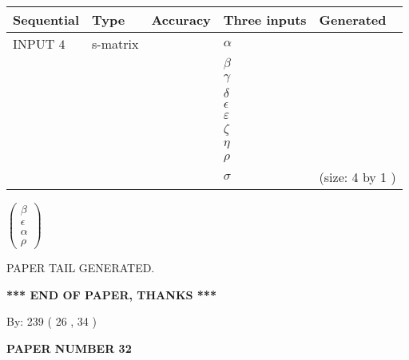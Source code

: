 \documentclass[12pt]{article}
\begin{document}
  
\noindent\begin{tabular}{|l|l|l|l|l|}
\hline
 Sequential & Type & Accuracy & Three inputs & Generated \\ 
\hline
 
 
  INPUT $  4 $ & s-matrix & & 
 $  \alpha $ & 
  \\
  & & & 
 $  \beta $ & 
  \\
  & & & 
 $  \gamma $ & 
  \\
  & & & 
 $  \delta $ & 
  \\
  & & & 
 $  \epsilon $ & 
  \\
  & & & 
 $  \varepsilon $ & 
  \\
  & & & 
 $                     \zeta $ & 
  \\
  & & & 
 $  \eta $ & 
  \\
  & & & 
 $  \rho $ & 
  \\
  & & & 
 $  \sigma $ & 
  (size:  4  by  1 )
 \\  \hline  
 \end{tabular}
   
   
 $  \left( \begin{array}
 {
 c
 }
 \beta \\ 
 \epsilon \\ 
 \alpha \\ 
 \rho
 \end{array} \right) $ 
   
   
   
   
 \vspace{0.2in}
 
   
   
\vspace{2.0in} PAPER TAIL GENERATED.
   
   
   
   
\vspace{1.0in} 
{\textbf{\large{ *** END OF PAPER, THANKS *** }}} 
   
   
\hspace{1.0in} By: 
 239 ( 26 ,  34 )
   
   
   
   
\newpage 
\setcounter{page}{ 
    32001 } 
   
   
   
   
 {\textbf{ \Large{ PAPER NUMBER  32  }}}
   
   
\vspace{0.2in}
   
   
   
\end{document}
